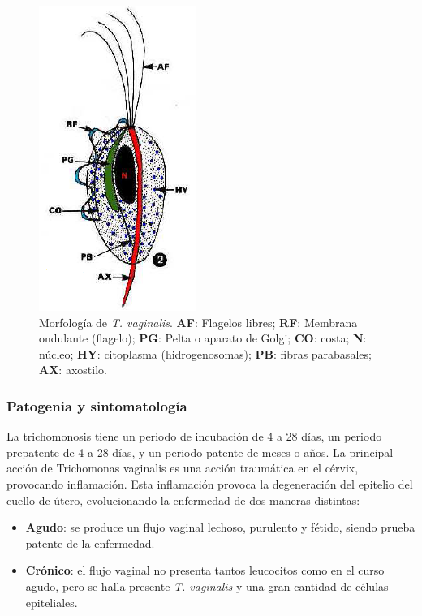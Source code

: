 \begin{multicols}{2}
\begin{figure}[H]
		\includegraphics[width=0.585\columnwidth]{A.imagenes/ACV-BioSan-Parasit-TVaginalisMorf}
		\caption[Morfología de \textit{T. vaginalis}]{Morfología de \textit{T. vaginalis}. \textbf{AF}: Flagelos libres; \textbf{RF}: Membrana ondulante (flagelo); \textbf{PG}: Pelta o aparato de Golgi; \textbf{CO}: costa; \textbf{N}: núcleo; \textbf{HY}: citoplasma (hidrogenosomas); \textbf{PB}: fibras parabasales; \textbf{AX}: axostilo.\label{fig:PARASIT:TvaginalisMorf}}
	\end{figure}
\end{multicols}
\subsubsection{Patogenia y sintomatología}
La trichomonosis tiene un periodo de incubación de 4 a 28 días, un periodo prepatente de 4 a 28 días, y un periodo patente de meses o años. La principal acción de Trichomonas vaginalis es una acción traumática en el cérvix, provocando inflamación. Esta inflamación provoca la degeneración del epitelio del cuello de útero, evolucionando la enfermedad de dos maneras distintas:
\begin{itemize}[itemsep=0pt,parsep=0pt,topsep=0pt,partopsep=0pt]
	\item \textbf{Agudo}: se produce un flujo vaginal lechoso, purulento y fétido, siendo prueba patente de la enfermedad.
	\item \textbf{Crónico}: el flujo vaginal no presenta tantos leucocitos como en el curso agudo, pero se halla presente \textit{T. vaginalis} y una gran cantidad de células epiteliales.
\end{itemize}

